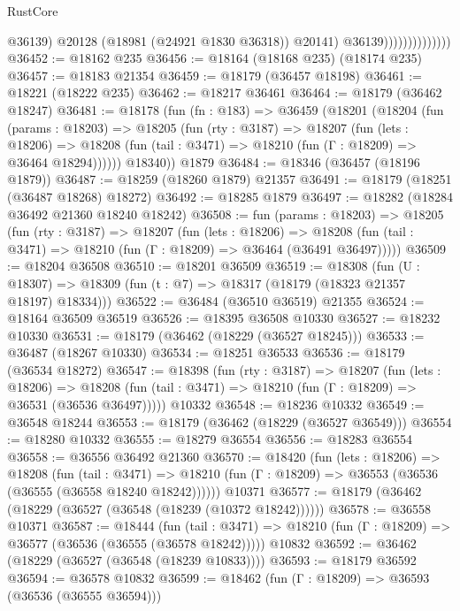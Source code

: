 \begin{lexlean}{RustCore}
\begin{coremodule}
                                    @36139)
                                  @20128
                                  (@18981 (@24921 @1830 @36318))
                                  @20141)
                                @36139))))))))))))))
@36452 := @18162 @235
@36456 := @18164 (@18168 @235) (@18174 @235)
@36457 := @18183 @21354
@36459 := @18179 (@36457 @18198)
@36461 := @18221 (@18222 @235)
@36462 := @18217 @36461
@36464 := @18179 (@36462 @18247)
@36481 := @18178
    (fun (fn : @183) =>
    @36459
      (@18201
        (@18204
          (fun (params : @18203) =>
          @18205
            (fun (rty : @3187) =>
            @18207
              (fun (lets : @18206) =>
              @18208 (fun (tail : @3471) => @18210 (fun (Γ : @18209) => @36464 @18294))))))
        @18340))
    @1879
@36484 := @18346 (@36457 (@18196 @1879))
@36487 := @18259 (@18260 @1879) @21357
@36491 := @18179 (@18251 (@36487 @18268) @18272)
@36492 := @18285 @1879
@36497 := @18282 (@18284 @36492 @21360 @18240 @18242)
@36508 := fun (params : @18203) =>
  @18205
    (fun (rty : @3187) =>
    @18207
      (fun (lets : @18206) =>
      @18208 (fun (tail : @3471) => @18210 (fun (Γ : @18209) => @36464 (@36491 @36497)))))
@36509 := @18204 @36508
@36510 := @18201 @36509
@36519 := @18308
    (fun (U : @18307) => @18309 (fun (t : @7) => @18317 (@18179 (@18323 @21357 @18197) @18334)))
@36522 := @36484 (@36510 @36519) @21355
@36524 := @18164 @36509 @36519
@36526 := @18395 @36508 @10330
@36527 := @18232 @10330
@36531 := @18179 (@36462 (@18229 (@36527 @18245)))
@36533 := @36487 (@18267 @10330)
@36534 := @18251 @36533
@36536 := @18179 (@36534 @18272)
@36547 := @18398
    (fun (rty : @3187) =>
    @18207
      (fun (lets : @18206) =>
      @18208 (fun (tail : @3471) => @18210 (fun (Γ : @18209) => @36531 (@36536 @36497)))))
    @10332
@36548 := @18236 @10332
@36549 := @36548 @18244
@36553 := @18179 (@36462 (@18229 (@36527 @36549)))
@36554 := @18280 @10332
@36555 := @18279 @36554
@36556 := @18283 @36554
@36558 := @36556 @36492 @21360
@36570 := @18420
    (fun (lets : @18206) =>
    @18208
      (fun (tail : @3471) =>
      @18210 (fun (Γ : @18209) => @36553 (@36536 (@36555 (@36558 @18240 @18242))))))
    @10371
@36577 := @18179 (@36462 (@18229 (@36527 (@36548 (@18239 (@10372 @18242))))))
@36578 := @36558 @10371
@36587 := @18444
    (fun (tail : @3471) => @18210 (fun (Γ : @18209) => @36577 (@36536 (@36555 (@36578 @18242)))))
    @10832
@36592 := @36462 (@18229 (@36527 (@36548 (@18239 @10833))))
@36593 := @18179 @36592
@36594 := @36578 @10832
@36599 := @18462 (fun (Γ : @18209) => @36593 (@36536 (@36555 @36594)))

\end{coremodule}
\end{lexlean}
